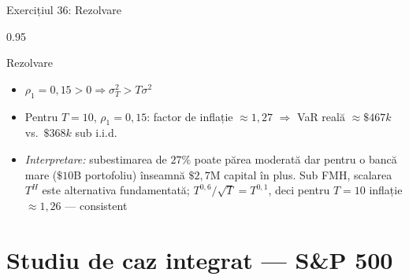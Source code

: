 \documentclass[9pt, aspectratio=169, t]{beamer}
\begin{document}
\begin{frame}[shrink=25]{Exercițiul 36: Rezolvare}
\begin{cminipage}{0.95\textwidth}
\begin{exampleblock}{Rezolvare}
\begin{itemize}
\begin{itemize}
        \item $\rho_1 = 0{,}15 > 0 \Rightarrow \sigma_T^2 > T\sigma^2$
        \item Pentru $T = 10$, $\rho_1 = 0{,}15$: factor de inflație $\approx 1{,}27$ $\Rightarrow$ VaR reală $\approx \$467k$ vs.\ $\$368k$ sub i.i.d.
        \item \textit{Interpretare:} subestimarea de $27\%$ poate părea moderată dar pentru o bancă mare ($\$10$B portofoliu) înseamnă $\$2{,}7$M capital în plus. Sub FMH, scalarea $T^H$ este alternativa fundamentată; $T^{0{,}6}/\sqrt T = T^{0{,}1}$, deci pentru $T = 10$ inflație $\approx 1{,}26$ — consistent
    \end{itemize}
\end{itemize}
\end{exampleblock}
\end{cminipage}
\end{frame}

\section{Studiu de caz integrat --- S\&P 500}
\end{document}
